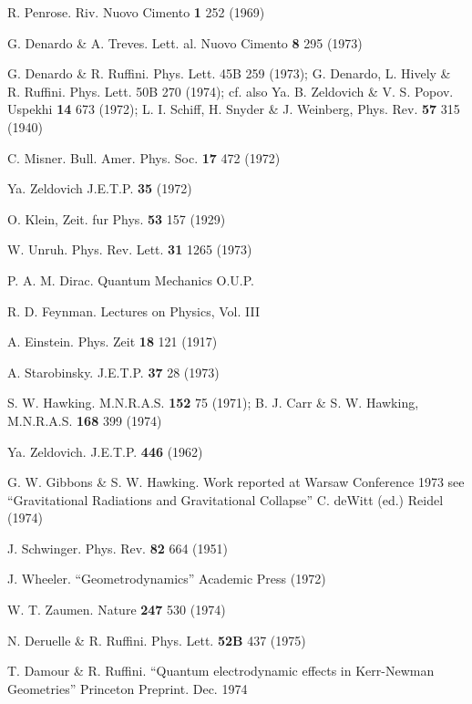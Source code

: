 \begin{thebibliography}{100}

\small
\raggedright

 R. Penrose. Riv. Nuovo Cimento {\bf 1} 252 (1969)

 G. Denardo \& A. Treves. Lett. al. Nuovo Cimento {\bf 8} 295 (1973)

 G. Denardo \& R. Ruffini. Phys. Lett. 45B 259 (1973); G. Denardo, L. Hively
\& R. Ruffini. Phys. Lett. 50B 270 (1974); cf. also Ya. B. Zeldovich \&
V. S. Popov. Uspekhi {\bf 14} 673 (1972); L. I. Schiff, H. Snyder \& J. Weinberg,
Phys. Rev. {\bf 57} 315 (1940)

 C. Misner. Bull. Amer. Phys. Soc. {\bf 17} 472 (1972)

\bibitem[5]{} Ya. Zeldovich J.E.T.P. {\bf 35} (1972)

\bibitem[6]{} O. Klein, Zeit. fur Phys. {\bf 53} 157 (1929)

 W. Unruh. Phys. Rev. Lett. {\bf 31} 1265 (1973)

 P. A. M. Dirac. Quantum Mechanics O.U.P.

\bibitem[9]{} R. D. Feynman. Lectures on Physics, Vol. III

\bibitem[10]{} A. Einstein. Phys. Zeit \textbf{18} 121 (1917)

\bibitem[11]{} A. Starobinsky. J.E.T.P. \textbf{37} 28 (1973)

\bibitem[12]{} S. W. Hawking.
M.N.R.A.S. \textbf{152} 75 (1971); B. J. Carr \& S. W. Hawking,
M.N.R.A.S. \textbf{168} 399 (1974)

 Ya. Zeldovich. J.E.T.P. \textbf{446} (1962) 

 G. W. Gibbons \& S. W. Hawking. Work reported at Warsaw Conference 1973
see ``Gravitational Radiations and Gravitational Collapse'' C. deWitt (ed.) Reidel (1974)

\bibitem[15]{} J. Schwinger. Phys. Rev. \textbf{82} 664 (1951)

\bibitem[16]{} J. Wheeler. ``Geometrodynamics'' Academic Press (1972)

\bibitem[17]{} W. T. Zaumen. Nature \textbf{247} 530 (1974)

\bibitem[19]{} N. Deruelle \& R. Ruffini. Phys. Lett. \textbf{52B} 437 (1975)

\bibitem[20]{} T. Damour \& R. Ruffini. ``Quantum electrodynamic effects in Kerr-Newman
Geometries'' Princeton Preprint. Dec. 1974


\end{thebibliography}
